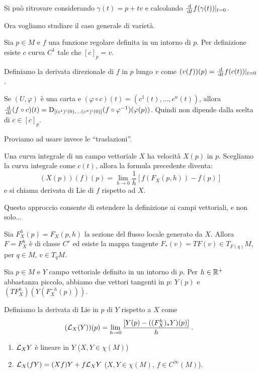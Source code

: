 Si può ritrovare considerando $\gamma(t)=p+tv$ e calcolando $\frac {\,\mathrm d}{\,\mathrm d t} f(\gamma(t))|_{t=0}$.

Ora vogliamo studiare il caso generale di varietà.

Sia $p\in M$ e $f$ una funzione regolare definita in un intorno di $p$. Per definizione esiste $c$ curva $C^1$ tale che $[c]_p=v$.

\begin{definition}
	Definiamo la derivata direzionale di $f$ in $p$ lungo $v$ come $(v(f))(p)=\frac {\,\mathrm d} {\,\mathrm d t} f(c(t))|_{t=0}$.
\end{definition}

Se $(U,\varphi)$ è una carta e $(\varphi\circ c)(t)=(c^1(t),\ldots,c^n(t))$, allora $\frac {\,\mathrm d}{\,\mathrm d t} (f\circ c)(t)=\mathrm D_{[(c^1)'(0),\ldots(c^n)'(0)]}(f\circ\varphi^{-1})(\varphi(p))$. Quindi non dipende dalla scelta di $c\in[c]_p$.

Proviamo ad usare invece le ``traslazioni''.

Una curva integrale di un campo vettoriale $X$ ha velocità $X(p)$ in $p$. Scegliamo la curva integrale come $c(t)$, allora la formula precedente diventa:
\begin{equation*}
	(X(p))(f)(p)=\lim_{h\to 0} \frac 1h [f(F_X(p,h))-f(p)]
\end{equation*}
e si chiama derivata di Lie di $f$ rispetto ad $X$.

Questo approccio consente di estendere la definizione ai campi vettoriali, e non solo...

Sia $F_X^h(p)=F_X(p,h)$ la sezione del flusso locale generato da $X$. Allora $F=F_X^h$ è di classe $C^r$ ed esiste la mappa tangente $F_*(v)=TF(v)\in T_{F(q)}M$, per $q\in M$, $v\in T_qM$.

Sia $p\in M$ e $Y$ campo vettoriale definito in un intorno di $p$. Per $h\in\mathbb R^+$ abbastanza piccolo, abbiamo due vettori tangenti in $p$: $Y(p)$ e $(TF_X^h)(Y(F_X^{-h}(p)))$.

\begin{definition}
	Definiamo la derivata di Lie in $p$ di $Y$ rispetto a $X$ come \begin{equation*}(\mathcal L_X(Y))(p)=\lim_{h\to 0}\frac{[Y(p)-((F_X^h)_*Y)(p)]}h \, \text{. }
	\end{equation*}
\end{definition}

\begin{proposition}
	\begin{enumerate}
		\item $\mathcal L_XY$ è lineare in $Y$ ($X,Y\in\chi(M)$)
		\item $\mathcal L_X(fY)=(Xf)Y+f\mathcal L_XY$ ($X,Y\in\chi(M)$, $f\in C^\infty(M)$).
	\end{enumerate}
\end{proposition}

